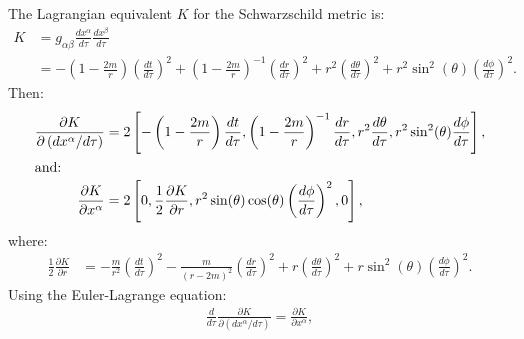 \documentclass[a4paper]{article}
\begin{document}
\section{}
\subsection{}
The Lagrangian equivalent $K$ for the Schwarzschild metric is:
\begin{align*}
	K &= g_{\alpha \beta} \frac{dx^\alpha}{d\tau} \frac{dx^\beta}{d\tau}\\
	&=	-\left( 1- \frac{2m}{r}\right) \left( \frac{dt}{d\tau} \right)^2 + \left( 1- \frac{2m}{r}\right)^{-1} \left( \frac{dr}{d\tau} \right)^2    + r^2 \left( \frac{d\theta}{d\tau} \right)^2  + r^2 \sin^2(\theta) \left( \frac{d\phi}{d\tau} \right)^2  . 
\end{align*}
Then:
\begin{align*}
\frac{\partial K}{\partial \left(dx^\alpha / d\tau \right)} &= 2\left[-\left( 1- \frac{2m}{r}\right) \frac{dt}{d\tau} , \left( 1- \frac{2m}{r}\right)^{-1} \frac{dr}{d\tau} , r^2 \frac{d\theta}{d\tau} , r^2 \sin^2(\theta) \frac{d\phi}{d\tau} \right], \\
\intertext{and:}
\frac{\partial K}{\partial x^\alpha} &= 2\left[0, \frac{1}{2}\frac{\partial K}{\partial r}, r^2 \sin(\theta)\cos(\theta) \left( \frac{d\phi}{d\tau} \right)^2, 0 \right],
\end{align*}
where:
\begin{align*}
	\frac{1}{2}\frac{\partial K}{\partial r} &= -\frac{m}{r^2} \left(\frac{dt}{d\tau} \right)^2 - \frac{m}{(r-2m)^2}  \left(\frac{dr}{d\tau} \right)^2 + r  \left(\frac{d\theta}{d\tau} \right)^2  + r\sin^2(\theta)  \left(\frac{d\phi}{d\tau} \right)^2.
\end{align*}
Using the Euler-Lagrange equation:
\begin{align*}
\frac{d}{d\tau} \frac{\partial K}{\partial(dx^\alpha / d\tau)}  = \frac{\partial K}{\partial x^\alpha},
\end{align*}
\end{document}
